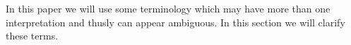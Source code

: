 In this paper we will use some terminology which may have more than one interpretation and thusly can appear ambiguous.
In this section we will clarify these terms.
